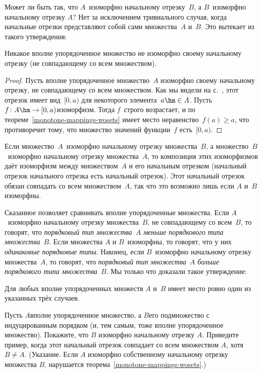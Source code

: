 Может ли быть так, что $A$~изоморфно начальному отрезку~$B$, а
$B$~изоморфно начальному отрезку $A$? Нет\т
за исключением
тривиального случая, когда начальные отрезки представляют собой
сами множества~$A$ и~$B$. Это вытекает из такого утверждения:
\begin{theorem}\label{nontrivial-initial-segment}
Никакое вполне упорядоченное множество не изоморфно своему
начальному отрезку (не совпадающему
со всем множеством).
\end{theorem}
\begin{proof}
Пусть вполне упорядоченное множество~$A$ изоморфно своему
начальному отрезку, не совпадающему со всем множеством. Как мы
видели на с.~\pageref{initial-segment-structure},
этот отрезок имеет вид~$[0,a)$ для некоторого
элемента~$a\hm\in A$. Пусть $f\colon A\hm\to[0,a)$\т изоморфизм. Тогда
$f$~строго возрастает, и по теореме~\ref{monotone-mappings-wosets}
имеет место неравенство~$f(a)\ge a$, что противоречит тому, что
множество значений функции~$f$ есть~$[0,a)$.
\end{proof}

Если множество~$A$~изоморфно начальному отрезку
множества~$B$, а множество~$B$~изоморфно начальному отрезку
множества~$A$, то композиция этих изоморфизмов даёт изоморфизм
между множеством~$A$ и его начальным отрезком (начальный отрезок
начального отрезка есть начальный отрезок). Этот начальный
отрезок обязан совпадать со всем множеством~$A$, так что это
возможно лишь если $A$ и~$B$ изоморфны.

Сказанное позволяет сравнивать
вполне упорядоченные множества.
Если $A$~изоморфно начальному отрезку множества~$B$, не
совпадающему со всем~$B$, то говорят, что \emph{порядковый тип
множества~$A$ меньше порядкового типа множества~$B$}.
Если
множества $A$ и $B$~изоморфны, то говорят, что у них
\emph{одинаковые порядковые типы}. Наконец, если $B$~изоморфно
начальному отрезку множества~$A$, то говорят, что \emph{порядковый
тип множества~$A$ больше порядкового типа множества~$B$}.
Мы только что доказали такое утверждение:
\begin{theorem}\label{ordinals-trichotomy}
Для любых вполне упорядоченных множеств $A$ и~$B$
имеет место ровно один из указанных трёх случаев.
\end{theorem}

\begin{problem}
     \label{subset-initial}
Пусть $A$\т вполне упорядоченное множество, а $B$\т его подмножество с индуцированным порядком (и, тем самым, тоже вполне упорядоченное множество). Покажите, что $B$ изоморфно начальному отрезку $A$. Приведите пример, когда этот начальный отрезок совпадает со всем множеством $A$, хотя $B\ne A$.  (Указание. Если $A$ изоморфно собственному начальному отрезку множества $B$, нарушается теорема~\ref{monotone-mappings-wosets}.)
\end{problem}


